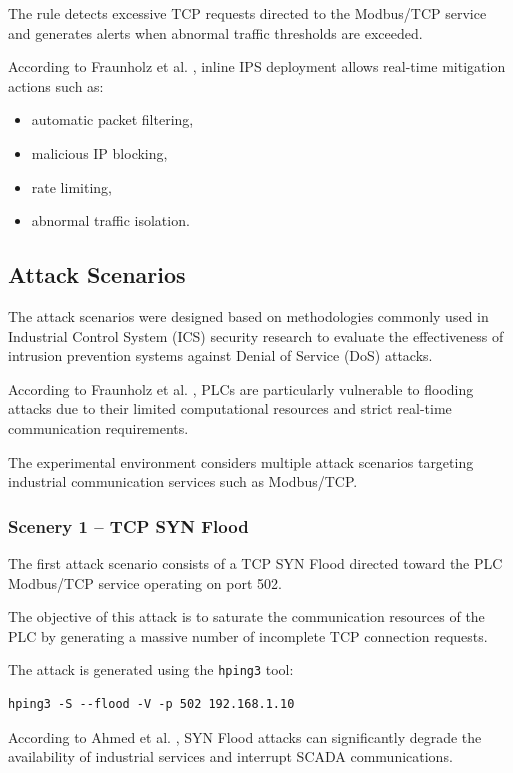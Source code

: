 \documentclass[sigconf]{acmart}
\begin{document}
The rule detects excessive TCP requests directed to the Modbus/TCP service and generates alerts when abnormal traffic thresholds are exceeded.

According to Fraunholz et al. \cite{fraunholz2018industrial}, inline IPS deployment allows real-time mitigation actions such as:
\begin{itemize}
    \item automatic packet filtering,
    \item malicious IP blocking,
    \item rate limiting,
    \item abnormal traffic isolation.
\end{itemize}

\subsection{Attack Scenarios}

The attack scenarios were designed based on methodologies commonly used in Industrial Control System (ICS) security research to evaluate the effectiveness of intrusion prevention systems against Denial of Service (DoS) attacks.

According to Fraunholz et al. \cite{fraunholz2018industrial}, PLCs are particularly vulnerable to flooding attacks due to their limited computational resources and strict real-time communication requirements.

The experimental environment considers multiple attack scenarios targeting industrial communication services such as Modbus/TCP.

\subsubsection{Scenery 1 -- TCP SYN Flood}

The first attack scenario consists of a TCP SYN Flood directed toward the PLC Modbus/TCP service operating on port 502.

The objective of this attack is to saturate the communication resources of the PLC by generating a massive number of incomplete TCP connection requests.

The attack is generated using the \texttt{hping3} tool:

\begin{verbatim}
hping3 -S --flood -V -p 502 192.168.1.10
\end{verbatim}

According to Ahmed et al. \cite{ahmed2019survey}, SYN Flood attacks can significantly degrade the availability of industrial services and interrupt SCADA communications.
\end{document}
